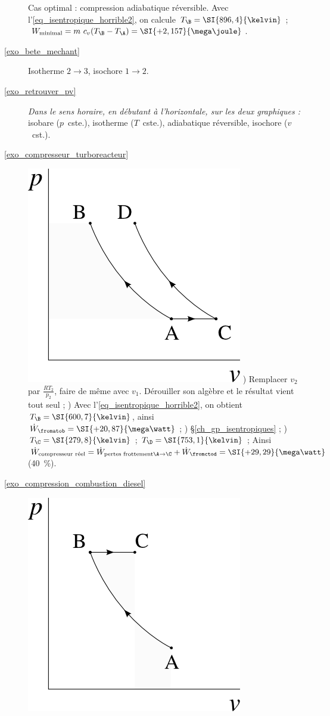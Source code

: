 \begin{description}
						\tab Cas optimal : compression adiabatique réversible. Avec l’\cref{eq_isentropique_horrible2}, on calcule $T_\B = \SI{896,4}{\kelvin}$ ; $W_\text{minimal} = m \ c_v (T_\B - T_\A) = \SI{+2,157}{\mega\joule}$.
	\item [\ref{exo_bete_mechant}]
						\tab Isotherme $2 \to 3$, isochore $1 \to 2$.
	\item [\ref{exo_retrouver_pv}]
						\tab \textit{Dans le sens horaire, en débutant à l’horizontale, sur les deux graphiques :} isobare ($p$~cste.), isotherme ($T$~cste.), adiabatique réversible, isochore ($v$~cst.).
	\item [\ref{exo_compresseur_turboreacteur}]
						\includegraphics[width=\solutiondiagramwidth]{images/exo_sol_pv_turbojet_compressor.png}
						) Remplacer $v_2$ par $\frac{R T_2}{p_2}$, faire de même avec $v_1$. Dérouiller son algèbre et le résultat vient tout seul ;
						) Avec l’\cref{eq_isentropique_horrible2}, on obtient $T_\B = \SI{600,7}{\kelvin}$, ainsi $\dot{W}_{\fromatob} = \SI{+20,87}{\mega\watt}$ ;
						) \S\ref{ch_gp_isentropiques} ;
						) $T_\C = \SI{279,8}{\kelvin}$ ; $T_\D = \SI{753,1}{\kelvin}$ ; Ainsi $\dot{W}_\text{compresseur réel} = \dot{W}_{\text{pertes frottement} \A \to \C} + \dot{W}_\fromctod = \SI{+29,29}{\mega\watt}$ (\SI{+40}{\percent}).
	\item [\ref{exo_compression_combustion_diesel}]
						\includegraphics[width=\solutiondiagramwidth]{images/exo_sol_pv_diesel.png}

\end{description}

